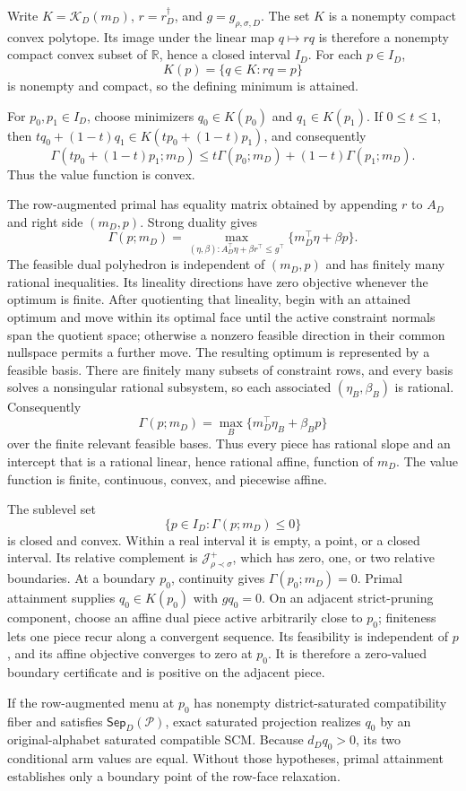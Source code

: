 Write \(K=\mathcal K_D(m_D)\), \(r=r_D^\dagger\), and \(g=g_{\rho,\sigma,D}\). The set \(K\) is a nonempty compact convex polytope. Its image under the linear map \(q\mapsto rq\) is therefore a nonempty compact convex subset of \(\mathbb R\), hence a closed interval \(I_D\). For each \(p\in I_D\),
\[
K(p)=\{q\in K:rq=p\}
\]
is nonempty and compact, so the defining minimum is attained.

For \(p_0,p_1\in I_D\), choose minimizers \(q_0\in K(p_0)\) and \(q_1\in K(p_1)\). If \(0\leq t\leq1\), then \(tq_0+(1-t)q_1\in K(tp_0+(1-t)p_1)\), and consequently
\[
\Gamma(tp_0+(1-t)p_1;m_D)
\leq t\Gamma(p_0;m_D)+(1-t)\Gamma(p_1;m_D).
\]
Thus the value function is convex.

The row-augmented primal has equality matrix obtained by appending \(r\) to \(A_D\) and right side \((m_D,p)\). Strong duality gives
\[
\Gamma(p;m_D)
=\max_{(\eta,\beta):A_D^\top\eta+\beta r^\top\leq g^\top}
\{m_D^\top\eta+\beta p\}.
\]
The feasible dual polyhedron is independent of \((m_D,p)\) and has finitely many rational inequalities. Its lineality directions have zero objective whenever the optimum is finite. After quotienting that lineality, begin with an attained optimum and move within its optimal face until the active constraint normals span the quotient space; otherwise a nonzero feasible direction in their common nullspace permits a further move. The resulting optimum is represented by a feasible basis. There are finitely many subsets of constraint rows, and every basis solves a nonsingular rational subsystem, so each associated \((\eta_B,\beta_B)\) is rational. Consequently
\[
\Gamma(p;m_D)=\max_B\{m_D^\top\eta_B+\beta_Bp\}
\]
over the finite relevant feasible bases. Thus every piece has rational slope and an intercept that is a rational linear, hence rational affine, function of \(m_D\). The value function is finite, continuous, convex, and piecewise affine.

The sublevel set
\[
\{p\in I_D:\Gamma(p;m_D)\leq0\}
\]
is closed and convex. Within a real interval it is empty, a point, or a closed interval. Its relative complement is \(\mathcal J_{\rho\prec\sigma}^+\), which has zero, one, or two relative boundaries. At a boundary \(p_0\), continuity gives \(\Gamma(p_0;m_D)=0\). Primal attainment supplies \(q_0\in K(p_0)\) with \(gq_0=0\). On an adjacent strict-pruning component, choose an affine dual piece active arbitrarily close to \(p_0\); finiteness lets one piece recur along a convergent sequence. Its feasibility is independent of \(p\), and its affine objective converges to zero at \(p_0\). It is therefore a zero-valued boundary certificate and is positive on the adjacent piece.

If the row-augmented menu at \(p_0\) has nonempty district-saturated compatibility fiber and satisfies \(\mathsf{Sep}_D(\mathcal P)\), exact saturated projection realizes \(q_0\) by an original-alphabet saturated compatible SCM. Because \(d_Dq_0>0\), its two conditional arm values are equal. Without those hypotheses, primal attainment establishes only a boundary point of the row-face relaxation.